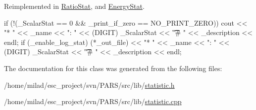 Reimplemented in \hyperlink{classRatioStat_abd9ca8637577996d227733f1f84469fd}{RatioStat}, and \hyperlink{classEnergyStat_aa54d089bd5f60f6e75abacf102225203}{EnergyStat}.


\begin{DoxyCode}
                                           {
    if (!(_ScalarStat == 0 && _print_if_zero == NO_PRINT_ZERO)) {
        cout << "* " << _name << ": " << (DIGIT) _ScalarStat << "\t\t\t # " << 
      _description << endl;
        if (_enable_log_stat) (*_out_file) << "* " << _name << ": " << (DIGIT) 
      _ScalarStat << "\t\t\t # " << _description << endl;
    }
}
\end{DoxyCode}


The documentation for this class was generated from the following files:\begin{DoxyCompactItemize}
\item 
/home/milad/esc\_\-project/svn/PARS/src/lib/\hyperlink{statistic_8h}{statistic.h}\item 
/home/milad/esc\_\-project/svn/PARS/src/lib/\hyperlink{statistic_8cpp}{statistic.cpp}\end{DoxyCompactItemize}
